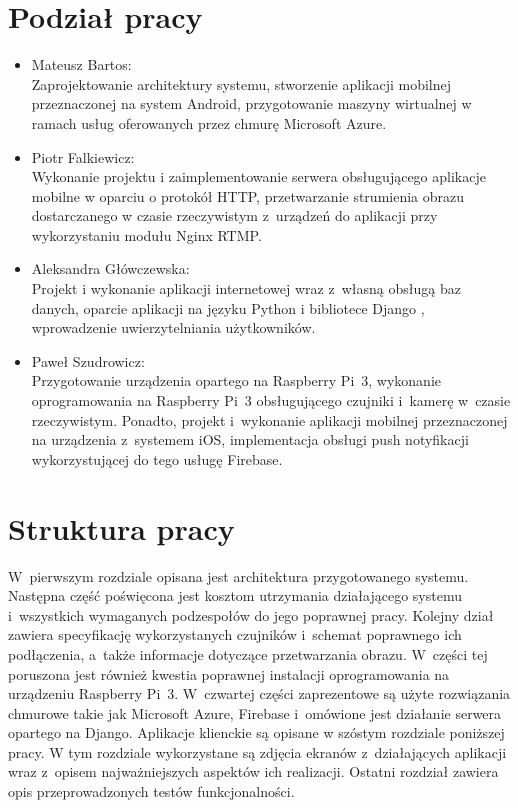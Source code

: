 \section{Podział pracy}
\begin{itemize}
\item Mateusz Bartos: \\
Zaprojektowanie architektury systemu, stworzenie aplikacji mobilnej przeznaczonej na system Android, przygotowanie maszyny wirtualnej w ramach usług oferowanych przez chmurę Microsoft Azure.
\item Piotr Falkiewicz: \\
Wykonanie projektu i zaimplementowanie serwera obsługującego aplikacje mobilne w oparciu o protokół HTTP, przetwarzanie strumienia obrazu dostarczanego w czasie rzeczywistym z~urządzeń do aplikacji przy wykorzystaniu modułu Nginx RTMP.
\item Aleksandra Główczewska: \\
Projekt i wykonanie aplikacji internetowej wraz z~własną obsługą baz danych, oparcie aplikacji na języku Python i bibliotece Django \cite{djangoREST}, wprowadzenie uwierzytelniania użytkowników.
\item Paweł Szudrowicz: \\
Przygotowanie urządzenia opartego na Raspberry Pi~3, wykonanie oprogramowania na Raspberry Pi~3 obsługującego czujniki i~kamerę w~czasie rzeczywistym. Ponadto, projekt i~wykonanie aplikacji mobilnej przeznaczonej na urządzenia z~systemem iOS, implementacja obsługi push notyfikacji wykorzystującej do tego usługę Firebase.
\end{itemize}

\section{Struktura pracy}
W~pierwszym rozdziale opisana jest architektura przygotowanego systemu. Następna część poświęcona jest kosztom utrzymania działającego systemu i~wszystkich wymaganych podzespołów do jego poprawnej pracy. Kolejny dział zawiera specyfikację wykorzystanych czujników i~schemat poprawnego ich podłączenia, a~także informacje dotyczące przetwarzania obrazu. W~części tej poruszona jest również kwestia poprawnej instalacji oprogramowania na urządzeniu Raspberry Pi~3.  W~czwartej części zaprezentowe są użyte rozwiązania chmurowe takie jak Microsoft Azure, Firebase i~omówione jest działanie serwera opartego na Django. Aplikacje klienckie są opisane w szóstym rozdziale poniższej pracy. W tym rozdziale wykorzystane są zdjęcia ekranów z~działających aplikacji wraz z~opisem najważniejszych aspektów ich realizacji. Ostatni rozdział zawiera opis przeprowadzonych testów funkcjonalności.
